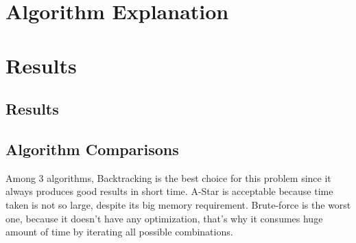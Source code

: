 \documentclass[12pt, a4paper]{article}
\begin{document}
\section{Algorithm Explanation}





\section{Results}

\subsection{Results}
\subsection{Algorithm Comparisons}
Among 3 algorithms, Backtracking is the best choice for this problem since it always produces good results in short time. A-Star is 
acceptable because time taken is not so large, despite its big memory requirement. Brute-force is the worst one, 
because it doesn't have any optimization, that's why it consumes huge amount of time by iterating all possible combinations.
\end{document}
